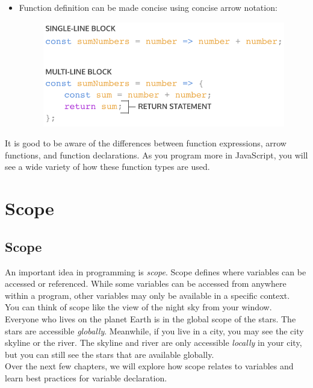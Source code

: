\documentclass[11pt]{article}
\begin{document}
\begin{itemize}[leftmargin = *]
\begin{figure}[H]
\centering
\end{figure}
\item Function definition can be made concise using concise arrow notation:
\begin{figure}[H]
\includegraphics[scale = 0.73]{4_10}
\centering
\end{figure}
\end{itemize}
It is good to be aware of the differences between function expressions, arrow functions, and function declarations. As you program more in JavaScript, you will see a wide variety of how these function types are used. 

\newpage
\section{Scope}
\subsection{Scope}
An important idea in programming is \textit{scope}. Scope defines where variables can be accessed or referenced. While some variables can be accessed from anywhere within a program, other variables may only be available in a specific context. \\
\newline
You can think of scope like the view of the night sky from your window. Everyone who lives on the planet Earth is in the global scope of the stars. The stars are accessible \textit{globally}. Meanwhile, if you live in a city, you may see the city skyline or the river. The skyline and river are only accessible \textit{locally} in your city, but you can still see the stars that are available globally. \\
\newline
Over the next few chapters, we will explore how scope relates to variables and learn best practices for variable declaration.
\end{document}
